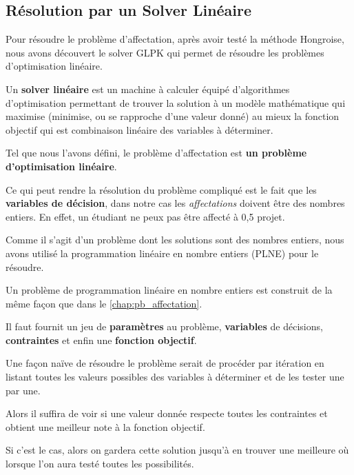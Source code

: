 \documentclass[final,poster]{polytech/polytech}
\begin{document}
\subsection{Résolution par un Solver Linéaire}

Pour résoudre le problème d'affectation, après avoir testé la méthode Hongroise, nous avons découvert le solver GLPK qui permet de résoudre les problèmes d'optimisation linéaire.

Un \textbf{solver linéaire}  est un machine à calculer équipé d'algorithmes d'optimisation permettant de trouver la solution à un modèle mathématique qui maximise (minimise, ou se rapproche d'une valeur donné) au mieux la fonction objectif qui est combinaison linéaire des variables à déterminer.

Tel que nous l'avons défini, le problème d'affectation est \textbf{un problème d'optimisation linéaire}. 

Ce qui peut rendre la résolution du problème compliqué est le fait que les \textbf{variables de décision}, dans notre cas les \textit{affectations} doivent être des nombres entiers. En effet, un étudiant ne peux pas être affecté à 0,5 projet.

Comme il s'agit d'un problème dont les solutions sont des nombres entiers, nous avons utilisé la programmation linéaire en nombre entiers (PLNE) pour le résoudre. 

Un problème de programmation linéaire en nombre entiers est construit de la même façon que dans le \autoref{chap:pb_affectation}. 

Il faut fournit un jeu de \textbf{paramètres} au problème, \textbf{variables} de décisions, \textbf{contraintes} et enfin une \textbf{fonction objectif}.


Une façon naïve de résoudre le problème serait de procéder par itération en listant toutes les valeurs possibles des variables à déterminer et de les tester une par une. 

Alors il suffira de voir si une valeur donnée respecte toutes les contraintes et obtient une meilleur note à la fonction objectif.

 Si c'est le cas, alors on gardera cette solution jusqu'à en trouver une meilleure où lorsque l'on aura testé toutes les possibilités.
\end{document}

